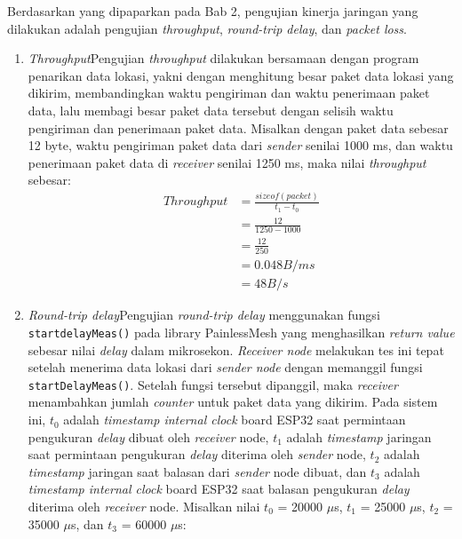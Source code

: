 Berdasarkan yang dipaparkan pada Bab 2, pengujian kinerja jaringan yang dilakukan adalah pengujian \textit{throughput}, \textit{round-trip delay}, dan \textit{packet loss}.
\begin{enumerate}
	\item \textit{Throughput}\newline Pengujian \textit{throughput} dilakukan bersamaan dengan program penarikan data lokasi, yakni dengan menghitung besar paket data lokasi yang dikirim, membandingkan waktu pengiriman dan waktu penerimaan paket data, lalu membagi besar paket data tersebut dengan selisih waktu pengiriman dan penerimaan paket data.
	\newline Misalkan dengan paket data sebesar 12 byte, waktu pengiriman paket data dari \textit{sender} senilai 1000 ms, dan waktu penerimaan paket data di \textit{receiver} senilai 1250 ms, maka nilai \textit{throughput} sebesar:
	\begin{equation}
		\begin{aligned}
		Throughput &= \frac{sizeof(packet)}{t_1 - t_0}\\
		&= \frac{12}{1250 - 1000}\\
		&= \frac{12}{250} \\
		& = 0.048 B/ms \\
		& = 48 B/s
		\end{aligned}
	\end{equation}
	\item \textit{Round-trip delay}\newline Pengujian \textit{round-trip delay} menggunakan fungsi \verb|startdelayMeas()| pada library PainlessMesh yang menghasilkan \textit{return value} sebesar nilai \textit{delay} dalam mikrosekon. \textit{Receiver node} melakukan tes ini tepat setelah menerima data lokasi dari \textit{sender node} dengan memanggil fungsi \verb|startDelayMeas()|. Setelah fungsi tersebut dipanggil, maka \textit{receiver} menambahkan jumlah \textit{counter} untuk paket data yang dikirim.
	\newline Pada sistem ini, $t_0$ adalah \textit{timestamp internal clock} board ESP32 saat permintaan pengukuran \textit{delay} dibuat oleh \textit{receiver} node, $t_1$ adalah \textit{timestamp} jaringan saat permintaan pengukuran \textit{delay} diterima oleh \textit{sender} node, $t_2$ adalah \textit{timestamp} jaringan saat balasan dari \textit{sender} node dibuat, dan $t_3$ adalah \textit{timestamp internal clock} board ESP32 saat balasan pengukuran \textit{delay} diterima oleh \textit{receiver} node. Misalkan nilai $t_0$ = 20000 $\mu$s, $t_1$ = 25000 $\mu$s, $t_2$ = 35000 $\mu$s, dan $t_3$ = 60000 $\mu$s:

\end{enumerate}
